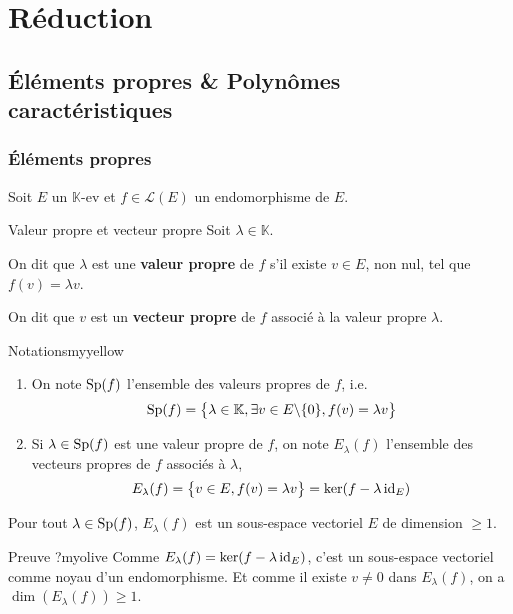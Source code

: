 \section{Réduction}

\subsection{Éléments propres \& Polynômes caractéristiques}

    \subsubsection{Éléments propres}

    Soit $E$ un $\mathbb{K}$-ev et $f \in \mathcal{L}(E)$ un endomorphisme de $E$.

    \begin{defi}{Valeur propre et vecteur propre}{}
        Soit $\lambda \in \mathbb{K}$. 

        On dit que $\lambda$ est une \textbf{valeur propre} de $f$ s’il existe $v \in E$, non nul, tel que $f(v) = \lambda v$.

        On dit que $v$ est un \textbf{vecteur propre} de $f$ associé à la valeur propre $\lambda$.
    \end{defi}

    \begin{omed}{Notations}{myyellow}
        \begin{enumerate}[label=\textcolor{myyellow}{\arabic*.}]
            \item On note $\operatorname{Sp}(f)$ l’ensemble des valeurs propres de $f$, i.e.
            \[ \operatorname{Sp}(f) = \big\{ \lambda \in \mathbb{K}, \exists v \in E \backslash \{0\} , f(v) = \lambda v \big\} \]    
            \item Si $\lambda \in \operatorname{Sp}(f)$ est une valeur propre de $f$, on note $E_{\lambda}(f)$ l’ensemble des vecteurs propres de $f$ associés à $\lambda$, 
            \[ E_{\lambda} (f) = \big\{ v \in E, f(v) = \lambda v \big\} = \ker(f - \lambda \operatorname{id}_E) \]
        \end{enumerate}
    \end{omed}

    \begin{prop}{}{}
        Pour tout $\lambda \in \operatorname{Sp}(f)$, $E_{\lambda}(f)$ est un sous-espace vectoriel $E$ de dimension $\geq 1$.
    \end{prop}

    \begin{demo}{Preuve ?}{myolive}
        Comme $E_{\lambda}(f) = \ker(f - \lambda \operatorname{id}_E)$, c’est un sous-espace vectoriel comme noyau d’un endomorphisme. Et comme il existe $v \neq 0$ dans $E_{\lambda}(f)$, on a $\dim(E_{\lambda}(f)) \geq 1$.
    \end{demo}

